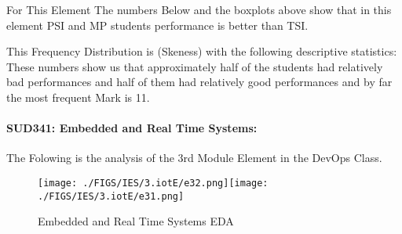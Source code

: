\documentclass[12pt]{extreport}
\begin{document}
For This Element The numbers Below and the boxplots above show that in this element  PSI and MP students performance is  better than TSI.



\begin{comment}


\begin{enumerate}	
	\item The MP Class Box-Plot:
	\begin{enumerate}
		\item MAX = a {} {} {} {} {} {} {} {} UQ = b {} {} {} {} {} {} {} {} Median = c
		\item LQ = d {} {} {} {} {} {} {} {}  MIN =	l {} {} {} {} {} {} {} {}  IQR = e - f = g
	\end{enumerate}
	\item The PSI Class Box-Plot:
	\begin{enumerate}
		\item MAX = a {} {} {} {} {} {} {} {} UQ = b {} {} {} {} {} {} {} {} Median = c
		\item LQ = d {} {} {} {} {} {} {} {}  MIN =	e {} {} {} {} {} {} {} {} IQR = f - g = h	
	\end{enumerate}
	\item The TSI Class Box-Plot:
	\begin{enumerate}
		\item MAX = a {} {} {} {} {} {} {} {} UQ = b {} {} {} {} {} {} {} {} Median = c
		\item LQ = d {} {} {} {} {} {} {} {} MIN = e {} {} {} {} {} {} {} {} IQR = f - g = h	
	\end{enumerate}
\end{enumerate}

\end{comment}


This Frequency Distribution is (Skeness) with the following descriptive statistics:
These numbers show us that approximately half of the students had relatively bad performances and half of them had relatively good performances and by far the most frequent Mark is 11.

\paragraph{\large SUD341: Embedded and Real Time Systems:\\
} 
The Folowing is the analysis of the 3rd Module Element in the DevOps Class.

\begin{figure}[H]
	\centering
	\texttt{[image: ./FIGS/IES/3.iotE/e32.png]}\texttt{[image: ./FIGS/IES/3.iotE/e31.png]}
	\caption{Embedded and Real Time Systems EDA}
	\label{fig:32}
\end{figure}
\end{document}
